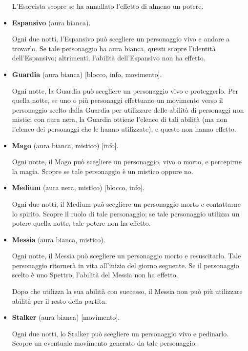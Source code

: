 \documentclass[a4paper,10pt]{article}
\begin{document}
\begin{itemize}
          L'Esorcista scopre se ha annullato l'effetto di almeno un potere.

    \item {\bf Espansivo} (aura bianca).

          Ogni due notti, l'Espansivo può scegliere un personaggio vivo e andare a trovarlo. Se tale personaggio ha aura bianca, questi scopre l'identità dell'Espansivo; altrimenti, l'abilità dell'Espansivo non ha effetto.

    \item {\bf Guardia} (aura bianca) [blocco, info, movimento].

          Ogni notte, la Guardia può scegliere un personaggio vivo e proteggerlo. Per quella notte, se uno o più personaggi effettuano un movimento verso il personaggio scelto dalla Guardia per utilizzare delle abilità di personaggi non mistici con aura nera, la Guardia ottiene l'elenco di tali abilità (ma non l'elenco dei personaggi che le hanno utilizzate), e queste non hanno effetto.

    \item {\bf Mago} (aura bianca, mistico) [info].

          Ogni notte, il Mago può scegliere un personaggio, vivo o morto, e percepirne la magia. Scopre se tale personaggio è un mistico oppure no.

    \item {\bf Medium} (aura nera, mistico) [blocco, info].

          Ogni due notti, il Medium può scegliere un personaggio morto e contattarne lo spirito. Scopre il ruolo di tale personaggio; se tale personaggio utilizza un potere quella notte, tale potere non ha effetto.

    \item {\bf Messia} (aura bianca, mistico).

          Ogni notte, il Messia può scegliere un personaggio morto e resuscitarlo. Tale personaggio ritornerà in vita all'inizio del giorno seguente. Se il personaggio scelto è uno Spettro, l'abilità del Messia non ha effetto.

          Dopo che utilizza la sua abilità con successo, il Messia non può più utilizzare abilità per il resto della partita.

    \item {\bf Stalker} (aura bianca) [movimento].

          Ogni due notti, lo Stalker può scegliere un personaggio vivo e pedinarlo. Scopre un eventuale movimento generato da tale personaggio.


\end{itemize}
\end{document}
